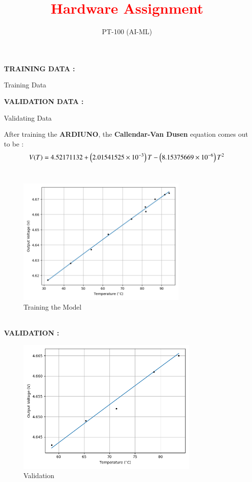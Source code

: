 \documentclass[journal]{IEEEtran}
\begin{document}

\vspace{3cm}

\title{\textbf{\textcolor{red}{Hardware Assignment}}}

\author{PT-100 (AI-ML)}
\date{}


{\let\newpage\relax\maketitle}
\textbf{TRAINING DATA :}
\begin{table}[h]    	
    \centering
     
    \caption{Training Data}
    \label{tab:1-1.9-6}
\end{table}
\textbf{VALIDATION DATA :}
\begin{table}[h]
	\centering
	
	\caption{Validating Data}
	\label{tab:2-1.9-7}
\end{table}
After training the \textbf{ARDIUNO}, the \textbf{Callendar-Van Dusen} equation comes out to be : \\
\begin{align}
	V(T) = 4.52171132 + \left(2.01541525 \times 10^{-3}\right) T -\left(8.15375669 \times 10^{-6}\right) T^2
\end{align}
\\
\begin{figure}[h]
	\centering
	\includegraphics[width=0.75\textwidth]{figs/train.png}
    \caption{Training the Model}
    \label{fig:PT100}  
\end{figure}
\\
\newpage
\textbf{VALIDATION :}
\begin{figure}[ht]  
    \centering
    \includegraphics[width=0.8\textwidth]{figs/valid.png}  
    \caption{Validation}
    \label{fig:Valid}  
\end{figure}
\end{document}
